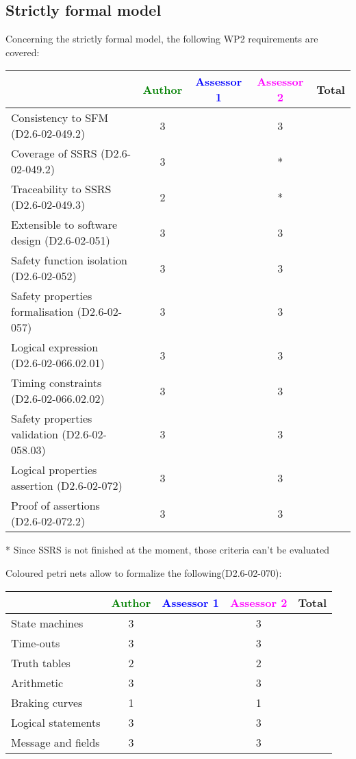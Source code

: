 \subsection{Strictly formal model}

Concerning the strictly formal model, the following WP2 requirements are covered:

\begin{tabular}{|l | c | c | c | c|}
\hline
& \textcolor{green}{Author} & \textcolor{blue}{Assessor 1} & \textcolor{magenta}{Assessor 2} & Total \\
\hline 
Consistency to SFM (D2.6-02-049.2) & 3    & & 3    &  \\
\hline
Coverage of SSRS (D2.6-02-049.2)  & 3    & & * &  \\
\hline
Traceability to  SSRS (D2.6-02-049.3)  & 2    & & * &  \\
\hline
Extensible to software design (D2.6-02-051)  & 3    & & 3    &  \\
\hline
Safety function isolation (D2.6-02-052)  & 3    & & 3    &  \\
\hline 
Safety properties formalisation (D2.6-02-057)  & 3    & & 3    &  \\
\hline
Logical expression (D2.6-02-066.02.01)  & 3    & & 3    &  \\
\hline
Timing constraints (D2.6-02-066.02.02)  & 3    & & 3    &  \\
\hline
Safety properties validation (D2.6-02-058.03)  & 3    & & 3    &  \\
\hline
Logical properties assertion (D2.6-02-072)  & 3    & & 3    &  \\
\hline
Proof of assertions (D2.6-02-072.2)  & 3    & & 3    &  \\
\hline
\end{tabular}

\begin{assessor2}
* Since SSRS is not finished at the moment, those criteria can't be evaluated
\end{assessor2}

Coloured petri nets allow to formalize the following(D2.6-02-070):

\begin{tabular}{|l | c | c | c | c|}
\hline
& \textcolor{green}{Author} & \textcolor{blue}{Assessor 1} & \textcolor{magenta}{Assessor 2} & Total \\
\hline 
State machines  & 3    & & 3    &  \\
\hline
Time-outs  & 3    & & 3    &  \\
\hline
Truth tables  & 2    & & 2    &  \\
\hline
Arithmetic  & 3    & & 3    &  \\
\hline
Braking curves  & 1    & & 1    &  \\
\hline
Logical statements & 3    & & 3    &  \\
\hline
Message and fields & 3    & & 3    &  \\
\hline
\end{tabular}

